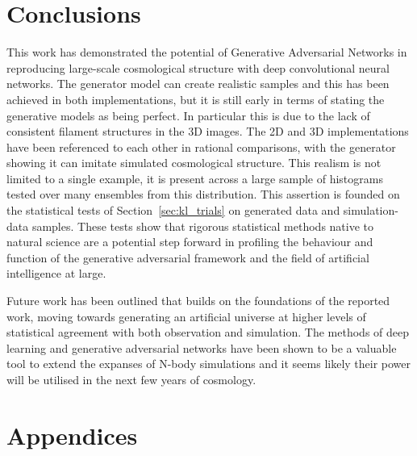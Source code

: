 \documentclass[twocolumn]{article}
\numberwithin{equation}{section}
\begin{document}
\section{Conclusions}\label{sec:conclusions}
This work has demonstrated the potential of Generative Adversarial Networks in reproducing large-scale cosmological structure with deep convolutional neural networks. The generator model can create realistic samples and this has been achieved in both implementations, but it is still early in terms of stating the generative models as being perfect. In particular this is due to the lack of consistent filament structures in the 3D images. The 2D and 3D implementations have been referenced to each other in rational comparisons, with the generator showing it can imitate simulated cosmological structure. %
This realism is not limited to a single example, it is present across a large sample of histograms tested over many ensembles from this distribution. This assertion is founded on the statistical tests of Section~\ref{sec:kl_trials} on generated data and simulation-data samples. These tests show that rigorous statistical methods native to natural science are a potential step forward in profiling the behaviour and function of the generative adversarial framework and the field of artificial intelligence at large. 

Future work has been outlined that builds on the foundations of the reported work, moving towards generating an artificial universe at higher levels of statistical agreement with both observation and simulation. The methods of deep learning and generative adversarial networks have been shown to be a valuable tool to extend the expanses of N-body simulations and it seems likely their power will be utilised in the next few years of cosmology. 



{\footnotesize  %
}


\setcounter{section}{0}
\section*{Appendices}

%
\appendix
\end{document}
